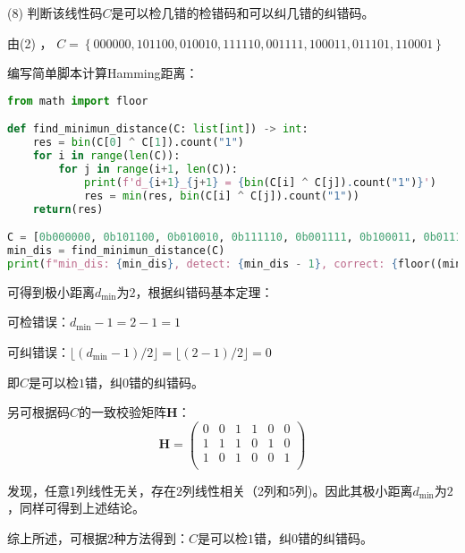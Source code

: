 (8) 判断该线性码$C$是可以检几错的检错码和可以纠几错的纠错码。

\begin{Solution}
    由(2) ， 
    $C=\left\{000000, 101100, 010010, 111110, 001111, 100011, 011101, 110001\right\}$

    编写简单脚本计算Hamming距离：

\begin{lstlisting}[language = Python]
from math import floor

def find_minimun_distance(C: list[int]) -> int:
    res = bin(C[0] ^ C[1]).count("1")
    for i in range(len(C)):
        for j in range(i+1, len(C)):
            print(f'd_{i+1}_{j+1} = {bin(C[i] ^ C[j]).count("1")}')
            res = min(res, bin(C[i] ^ C[j]).count("1"))
    return(res)

C = [0b000000, 0b101100, 0b010010, 0b111110, 0b001111, 0b100011, 0b011101, 0b110001]
min_dis = find_minimun_distance(C)
print(f"min_dis: {min_dis}, detect: {min_dis - 1}, correct: {floor((min_dis - 1)/2)}")
\end{lstlisting}

    可得到极小距离$d_{\min}$为$2$，根据纠错码基本定理：

    可检错误：$d_{\min} - 1 = 2 - 1  = 1$

    可纠错误：$\lfloor (d_{\min} -1)/ 2\rfloor = \lfloor (2 -1)/ 2\rfloor = 0$

    即$C$是可以检$1$错，纠$0$错的纠错码。

另可根据码$C$的一致校验矩阵$\bm{H}$：
\begin{equation}
    \bm{H} = 
    \left(
        \begin{matrix}
            0 &0 &1 &1 &0 &0\\
            1 &1 &1 &0 &1 &0\\
            1 &0 &1 &0 &0 &1\\
        \end{matrix}
    \right)
\end{equation}

    发现，任意1列线性无关，存在2列线性相关（2列和5列)。因此其极小距离$d_{\min}$为$2$，同样可得到上述结论。

    综上所述，可根据2种方法得到：$C$是可以检$1$错，纠$0$错的纠错码。
\end{Solution}